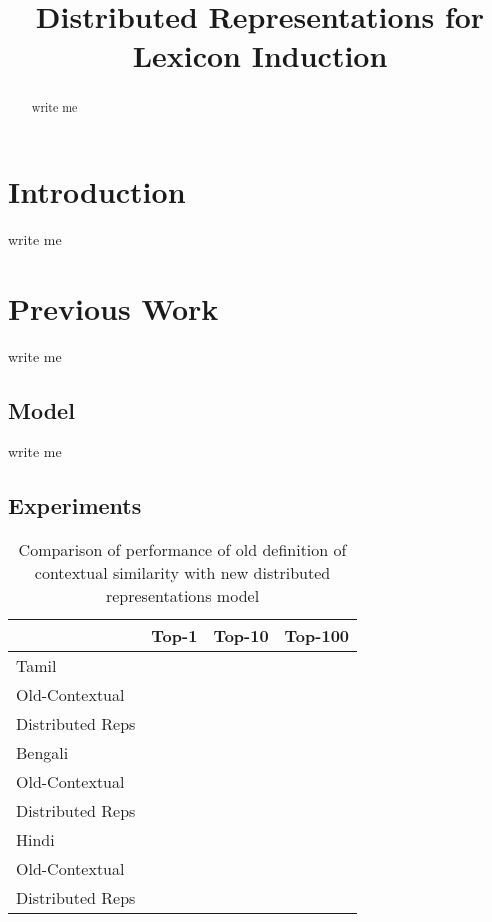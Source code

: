\documentclass[11pt,letterpaper]{article}
\title{Distributed Representations for Lexicon Induction}
\date{}
\begin{document}
\maketitle
\begin{abstract}
write me
\end{abstract}

\section{Introduction}
write me

\section{Previous Work}
write me

\subsection{Model}
write me

\subsection{Experiments}

\begin{table}
\begin{center}
\begin{tabular}{|l|c|c|c|}
\hline
& Top-1 & Top-10 & Top-100 \\
\hline
\multicolumn{4}{|l|}{Tamil}  \\
\hline
Old-Contextual & & & \\
Distributed Reps & & & \\
\hline
\multicolumn{4}{|l|}{Bengali}  \\
\hline
Old-Contextual & & & \\
Distributed Reps & & & \\
\hline
\multicolumn{4}{|l|}{Hindi}  \\
\hline
Old-Contextual & & & \\
Distributed Reps & & & \\
\hline
\end{tabular}
\end{center}
\caption{Comparison of performance of old definition of contextual similarity with new distributed representations model}\label{accresults}
\end{table}






\end{document}

